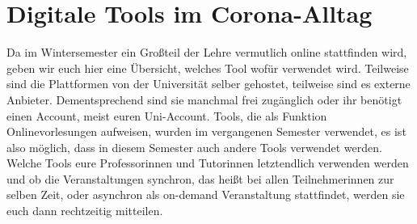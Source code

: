\section{Digitale Tools im Corona-Alltag}
Da im Wintersemester ein Großteil der Lehre vermutlich online stattfinden wird, geben wir euch hier eine Übersicht, welches Tool wofür verwendet wird. Teilweise sind die Plattformen von der Universität selber gehostet, teilweise sind es externe Anbieter. Dementsprechend sind sie manchmal frei zugänglich oder ihr benötigt einen Account, meist euren Uni-Account. Tools, die als Funktion Onlinevorlesungen aufweisen, wurden im vergangenen Semester verwendet, es ist also möglich, dass in diesem Semester auch andere Tools verwendet werden. Welche Tools eure Professorinnen und Tutorinnen letztendlich verwenden werden und ob die Veranstaltungen synchron, das heißt bei allen Teilnehmerinnen zur selben Zeit, oder asynchron als on-demand Veranstaltung stattfindet, werden sie euch dann rechtzeitig mitteilen.


		


